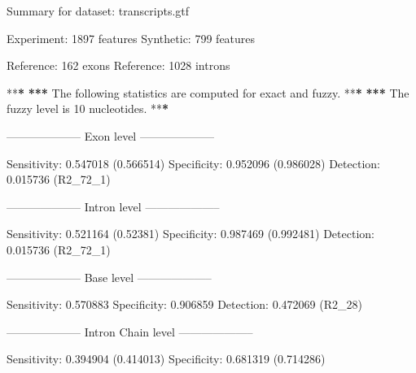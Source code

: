 \documentclass[]{article}
\newenvironment{Shaded}{\begin{snugshade}}{\end{snugshade}}
\newcommand{\DecValTok}[1]{\textcolor[rgb]{0.00,0.00,0.81}{{#1}}}
\newcommand{\FloatTok}[1]{\textcolor[rgb]{0.00,0.00,0.81}{{#1}}}
\newcommand{\StringTok}[1]{\textcolor[rgb]{0.31,0.60,0.02}{{#1}}}
\newcommand{\ErrorTok}[1]{\textbf{{#1}}}
\newcommand{\NormalTok}[1]{{#1}}
\begin{document}
\begin{Shaded}
\begin{Highlighting}[]
\NormalTok{Summary for dataset:}\StringTok{ }\NormalTok{transcripts.gtf}

   \NormalTok{Experiment:}\StringTok{ }\DecValTok{1897} \NormalTok{features}
   \NormalTok{Synthetic:}\StringTok{  }\DecValTok{799} \NormalTok{features}

   \NormalTok{Reference:}\StringTok{  }\DecValTok{162} \NormalTok{exons}
   \NormalTok{Reference:}\StringTok{  }\DecValTok{1028} \NormalTok{introns}

   \NormalTok{**}\ErrorTok{*}
\StringTok{   }\ErrorTok{***}\StringTok{ }\NormalTok{The following statistics are computed for exact and fuzzy.}
   \NormalTok{**}\ErrorTok{*}
\StringTok{   }\ErrorTok{***}\StringTok{ }\NormalTok{The fuzzy level is }\DecValTok{10} \NormalTok{nucleotides.}
   \NormalTok{**}\ErrorTok{*}

\StringTok{   }\NormalTok{--------------------}\StringTok{ }\NormalTok{Exon level --------------------}

\StringTok{   }\NormalTok{Sensitivity:}\StringTok{ }\FloatTok{0.547018} \NormalTok{(}\FloatTok{0.566514}\NormalTok{)}
   \NormalTok{Specificity:}\StringTok{ }\FloatTok{0.952096} \NormalTok{(}\FloatTok{0.986028}\NormalTok{)}
   \NormalTok{Detection:}\StringTok{   }\FloatTok{0.015736} \NormalTok{(R2_72_1)}

   \NormalTok{--------------------}\StringTok{ }\NormalTok{Intron level --------------------}

\StringTok{   }\NormalTok{Sensitivity:}\StringTok{ }\FloatTok{0.521164} \NormalTok{(}\FloatTok{0.52381}\NormalTok{)}
   \NormalTok{Specificity:}\StringTok{ }\FloatTok{0.987469} \NormalTok{(}\FloatTok{0.992481}\NormalTok{)}
   \NormalTok{Detection:}\StringTok{   }\FloatTok{0.015736} \NormalTok{(R2_72_1)}

   \NormalTok{--------------------}\StringTok{ }\NormalTok{Base level --------------------}

\StringTok{   }\NormalTok{Sensitivity:}\StringTok{ }\FloatTok{0.570883}
   \NormalTok{Specificity:}\StringTok{ }\FloatTok{0.906859}
   \NormalTok{Detection:}\StringTok{   }\FloatTok{0.472069} \NormalTok{(R2_28)}

   \NormalTok{--------------------}\StringTok{ }\NormalTok{Intron Chain level --------------------}

\StringTok{   }\NormalTok{Sensitivity:}\StringTok{ }\FloatTok{0.394904} \NormalTok{(}\FloatTok{0.414013}\NormalTok{)}
   \NormalTok{Specificity:}\StringTok{ }\FloatTok{0.681319} \NormalTok{(}\FloatTok{0.714286}\NormalTok{)}


\end{Highlighting}
\end{Shaded}
\end{document}
